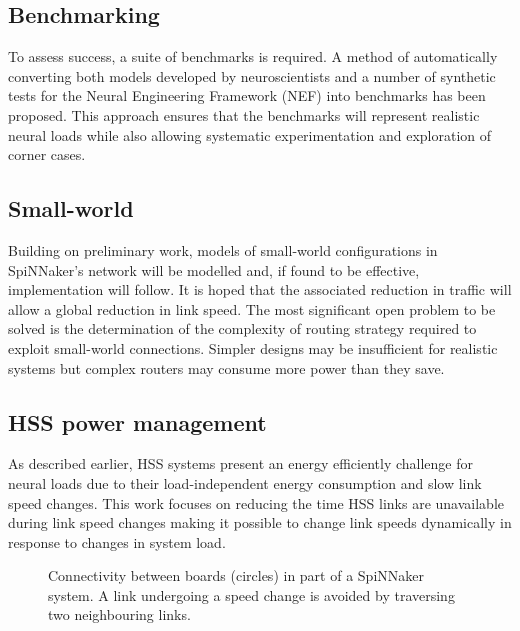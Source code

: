 	\subsection{Benchmarking}
		
		To assess success, a suite of benchmarks is required. A method of
		automatically converting both models developed by neuroscientists and a
		number of synthetic tests for the Neural Engineering Framework (NEF)
		\cite{eliasmith04} into benchmarks has been proposed. This approach ensures
		that the benchmarks will represent realistic neural loads while also
		allowing systematic experimentation and exploration of corner cases.
	
	\subsection{Small-world}
		
		Building on preliminary work, models of small-world configurations in
		SpiNNaker's network will be modelled and, if found to be effective,
		implementation will follow. It is hoped that the associated reduction in
		traffic will allow a global reduction in link speed. The most significant
		open problem to be solved is the determination of the complexity of routing
		strategy required to exploit small-world connections. Simpler designs may be
		insufficient for realistic systems but complex routers may consume more
		power than they save.
	
	\subsection{HSS power management}
		
		As described earlier, HSS systems present an energy efficiently challenge
		for neural loads due to their load-independent energy consumption and slow
		link speed changes. This work focuses on reducing the time HSS links are
		unavailable during link speed changes making it possible to change link
		speeds dynamically in response to changes in system load.
		
		\begin{figure}
			\center
			
			
			\caption{Connectivity between boards (circles) in part of a SpiNNaker
			system. A link undergoing a speed change is avoided by traversing two
			neighbouring links.}
			\label{fig:emergency-routing}
		\end{figure}
		
